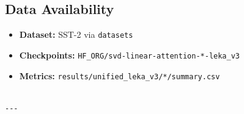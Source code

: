 \subsection{Data Availability}

\begin{itemize}
\item \textbf{Dataset:} SST-2 via \texttt{datasets}
\item \textbf{Checkpoints:} \texttt{{{HF\_ORG}}/svd-linear-attention-*-leka\_v3}
\item \textbf{Metrics:} \texttt{results/unified\_leka\_v3/*/summary.csv}
\end{itemize}
\begin{lstlisting}

---
\end{lstlisting}